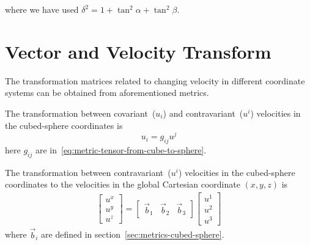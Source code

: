 \documentclass{report}
\begin{document}
\noindent where we have used $\delta^2 = 1 + \tan^2 \alpha + \tan^2 \beta$.

\section[Vector and Velocity Transform]{Vector and Velocity Transform}

The transformation matrices related to changing velocity in different coordinate systems can be obtained from aforementioned metrics.


The transformation between covariant~($u_i$) and contravariant~($u^i$) velocities in the cubed-sphere coordinates is
\[u_i =  g_{ij} u^j \]
here $g_{ij}$ are in~\eqref{eq:metric-tensor-from-cube-to-sphere}.

The transformation between contravariant~($u^i$) velocities in the cubed-sphere coordinates to the velocities in the global Cartesian coordinate $(x, y, z)$ is
\begin{align*} 
\begin{bmatrix}
             u^{x} \\ u^{y} \\ u^{z}
        \end{bmatrix}  
        = \begin{bmatrix}
             \vec{b}_{1} & \vec{b}_{2} & \vec{b}_{3}
             \end{bmatrix} 
             \begin{bmatrix}
             u^{1} \\ u^{2} \\ u^{3}
        \end{bmatrix}
\end{align*}
where $\vec{b}_i$ are defined in section~\ref{sec:metrics-cubed-sphere}.
\end{document}
